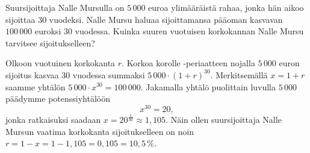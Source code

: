 \begin{esimerkki}
Suursijoittaja Nalle Mursulla on $5\,000$ euroa ylimääräistä rahaa, jonka hän aikoo sijoittaa $30$ vuodeksi.  Nalle Mursu haluaa sijoittamansa pääoman kasvavan $100\,000$ euroksi $30$ vuodessa.  Kuinka suuren vuotuisen korkokannan Nalle Mursu tarvitsee sijoitukselleen? 
	\begin{esimratk}
		Olkoon vuotuinen korkokanta $r$. Korkoa korolle -periaatteen nojalla $5\,000$ euron sijoitus kasvaa $30$ vuodessa summaksi $5\,000\cdot(1+r)^{30}$. Merkitsemällä $x=1+r$ saamme yhtälön $5\,000\cdot x^{30} = 100\,000$. Jakamalla yhtälö puolittain luvulla $5\,000$ päädymme potenssiyhtälöön
		\[ x^{30} = 20, \] 
		jonka ratkaisuksi saadaan $x=20^{\frac{1}{30}} \approx 1,105$. Näin ollen suursijoittaja Nalle Mursun vaatima korkokanta sijoitukselleen on noin $r=1-x=1-1,105=0,105=10,5\,\%$.
	\end{esimratk}
\end{esimerkki}
